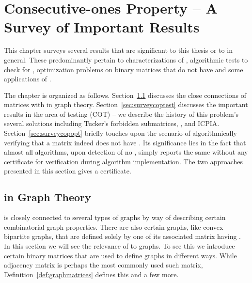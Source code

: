 \xclearpage


\chapter[COP -- A Survey]{Consecutive-ones Property -- A Survey of
  Important Results}
\label{ch:copsurvey}

This chapter surveys several results that are significant to this
thesis or to \COP in general. These predominantly pertain to
characterizations of \COP, algorithmic tests to check for \COP,
optimization problems on binary matrices that do not have \COP and
some applications of \COP.


The chapter is organized as follows. Section~\ref{sec:copgraphtheory}
discusses the close connections of matrices with \COP in graph
theory. Section~\ref{sec:surveycoptest} discusses the important
results in the area of \cop testing (COT) -- we describe the history
of this problem's several solutions including Tucker's forbidden
submatrices, \PQtree, \PQRtree and ICPIA.  
Section~\ref{sec:surveycopopt} briefly touches upon the scenario of
algorithmically verifying that a matrix indeed does not have \COP. Its
significance lies in the fact that almost all \COT algorithms, upon
detection of no \COP, simply reports the same without any certificate
for verification during algorithm implementation. The two approaches
presented in this section gives a certificate.


\section{\COP in Graph Theory}
\label{sec:copgraphtheory}

\COP is closely connected to several types of graphs by way of
describing certain combinatorial graph properties. There are also
certain graphs, like convex bipartite graphs, that are defined solely
by one of its associated matrix having \COP.  In this section we will
see the relevance of \cop to graphs.  To see this we introduce certain
binary matrices that are used to define graphs in different
ways. While adjacency matrix is perhaps the most commonly used such
matrix, Definition~\ref{def:graphmatrices} defines this and a few
more.

